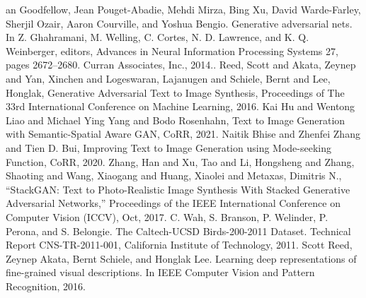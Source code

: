 \documentclass[conference]{IEEEtran}
\begin{document}
	\begin{thebibliography}{00}
		 an Goodfellow, Jean Pouget-Abadie, Mehdi Mirza, Bing Xu, David Warde-Farley, Sherjil Ozair, Aaron Courville, and Yoshua Bengio. Generative adversarial nets. In Z. Ghahramani, M. Welling, C. Cortes, N. D. Lawrence, and K. Q. Weinberger, editors, Advances in Neural Information Processing Systems 27, pages 2672–2680. Curran Associates, Inc., 2014..
		 Reed, Scott and Akata, Zeynep and Yan, Xinchen and Logeswaran, Lajanugen and Schiele, Bernt and Lee, Honglak, Generative Adversarial Text to Image Synthesis, Proceedings of The 33rd International Conference on Machine Learning, 2016.
		 Kai Hu and Wentong Liao and Michael Ying Yang and Bodo Rosenhahn, Text to Image Generation with Semantic-Spatial Aware {GAN}, CoRR, 2021.
		 Naitik Bhise and Zhenfei Zhang and Tien D. Bui, Improving Text to Image Generation using Mode-seeking Function, CoRR, 2020.
		 Zhang, Han and Xu, Tao and Li, Hongsheng and Zhang, Shaoting and Wang, Xiaogang and Huang, Xiaolei and Metaxas, Dimitris N., ``StackGAN: Text to Photo-Realistic Image Synthesis With Stacked Generative Adversarial Networks,'' Proceedings of the IEEE International Conference on Computer Vision (ICCV), Oct, 2017.
		 C. Wah, S. Branson, P. Welinder, P. Perona, and S. Belongie. The Caltech-UCSD Birds-200-2011 Dataset. Technical Report CNS-TR-2011-001, California Institute of Technology, 2011.
		Scott Reed, Zeynep Akata, Bernt Schiele, and Honglak Lee. Learning deep representations of fine-grained visual descriptions. In IEEE Computer Vision and Pattern Recognition, 2016.
	\end{thebibliography}
\end{document}

